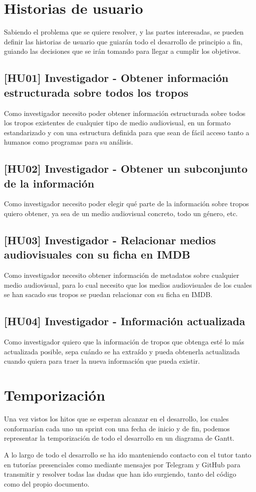 \section{Historias de usuario}
Sabiendo el problema que se quiere resolver, y las partes interesadas, se pueden definir las historias de usuario que guiarán todo el desarrollo de principio a fin, guiando las decisiones que se irán tomando para llegar a cumplir los objetivos.

\subsection{[HU01] Investigador - Obtener información estructurada sobre todos los tropos}
Como investigador necesito poder obtener información estructurada sobre todos los tropos existentes de cualquier tipo de medio audiovisual, en un formato estandarizado y con una estructura definida para que sean de fácil acceso tanto a humanos como programas para su análisis.

\subsection{[HU02] Investigador - Obtener un subconjunto de la información}
Como investigador necesito poder elegir qué parte de la información sobre tropos quiero obtener, ya sea de un medio audiovisual concreto, todo un género, etc.

\subsection{[HU03] Investigador - Relacionar medios audiovisuales con su ficha en IMDB}
Como investigador necesito obtener información de metadatos sobre cualquier medio audiovisual, para lo cual necesito que los medios audiovisuales de los cuales se han sacado sus tropos se puedan relacionar con su ficha en IMDB.

\subsection{[HU04] Investigador - Información actualizada}
Como investigador quiero que la información de tropos que obtenga esté lo más actualizada posible, sepa cuándo se ha extraído y pueda obtenerla actualizada cuando quiera para traer la nueva información que pueda existir.

\section{Temporización}
Una vez vistos los hitos que se esperan alcanzar en el desarrollo, los cuales conformarían cada uno un sprint con una fecha de inicio y de fin, podemos representar la temporización de todo el desarrollo en un diagrama de Gantt.

A lo largo de todo el desarrollo se ha ido manteniendo contacto con el tutor tanto en tutorías presenciales como mediante mensajes por Telegram y GitHub para transmitir y resolver todas las dudas que han ido surgiendo, tanto del código como del propio documento.